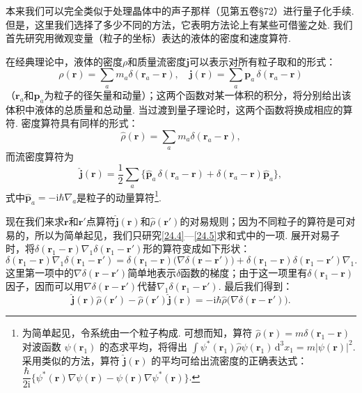 本来我们可以完全类似于处理晶体中的声子那样（见第五卷§72）进行量子化手续. 但是，这里我们选择了多少不同的方法，它表明方法论上有某些可借鉴之处. 我们首先研究用微观变量（粒子的坐标）表达的液体的密度和速度算符.

在经典理论中，液体的密度$\rho$和质量流密度$\bm{j}$可以表示对所有粒子取和的形式：
\begin{equation*}
\rho(\bm{r})=\sum_{a}m_{a}\delta(\bm{r}_{a}-\bm{r}),\quad
\bm{j}(\bm{r})=\sum_{a}\bm{p}_{a}\,\delta(\bm{r}_{a}-\bm{r})
\end{equation*}
（$\bm{r}_{a}$和$\bm{p}_{a}$为粒子的径矢量和动量）；这两个函数对某一体积的积分，将分别给出该体积中液体的总质量和总动量. 当过渡到量子理论时，这两个函数将换成相应的算符. 密度算符具有同样的形式：
\begin{equation}
\hat{\rho}(\bm{r})=\sum_{a}m_{a}\delta(\bm{r}_{a}-\bm{r}),
\label{24.4}
\end{equation}
而流密度算符为
\begin{equation}
\hat{\bm{j}}(\bm{r})=\frac{1}{2}\sum_{a}\bigl\{\hat{\bm{p}}_{a}\,\delta(\bm{r}_{a}-\bm{r})+\delta(\bm{r}_{a}-\bm{r})\hat{\bm{p}}_{a}\bigr\},
\label{24.5}
\end{equation}
式中$\hat{\bm{p}}_{a}=-\mathrm{i}\hbar\nabla_{a}$是粒子的动量算符\footnote{为简单起见，令系统由一个粒子构成. 可想而知，算符 $\hat{\rho}(\bm{r})=m\delta(\bm{r}_{1}-\bm{r})$ 对波函数 $\psi(\bm{r}_{1})$ 的态求平均，将得出 $\int\psi^{*}(\bm{r}_{1})\hat{\rho}\psi(\bm{r}_{1})\,\mathrm{d}^{3}x_{1}=m\vert\psi(\bm{r})\vert^{2}$. 采用类似的方法，算符 $\hat{\bm{j}}(\bm{r})$ 的平均可给出流密度的正确表达式：$\dfrac{\hbar}{2\mathrm{i}}\{\psi^{*}(\bm{r})\nabla\psi(\bm{r})-\psi(\bm{r})\nabla\psi^{*}(\bm{r})\}$.}.

现在我们来求$\bm{r}$和$\bm{r}'$点算符$\hat{\bm{j}}(\bm{r})$和$\hat{\rho}(\bm{r}')$的对易规则；因为不同粒子的算符是可对易的，所以为简单起见，我们只研究\eqref{24.4}—\eqref{24.5}求和式中的一项. 展开对易子时，将$\delta(\bm{r}_{1}-\bm{r})\nabla_{1}\delta(\bm{r}_{1}-\bm{r}')$形的算符变成如下形状：
\begin{equation*}
\delta(\bm{r}_{1}-\bm{r})\nabla_{1}\delta(\bm{r}_{1}-\bm{r}')
=\delta(\bm{r}_{1}-\bm{r})\bigl(\nabla\delta(\bm{r}-\bm{r}')\bigr)
+\delta(\bm{r}_{1}-\bm{r})\delta(\bm{r}_{1}-\bm{r}')\nabla_{1}.
\end{equation*}
这里第一项中的$\nabla\delta(\bm{r}-\bm{r}')$简单地表示$\delta$函数的梯度；由于这一项里有$\delta(\bm{r}_{1}-\bm{r})$因子，因而可以用$\nabla\delta(\bm{r}-\bm{r}')$代替$\nabla_{1}\delta(\bm{r}_{1}-\bm{r}')$. 最后我们得到：
\begin{equation}
\hat{\bm{j}}(\bm{r})\hat{\rho}(\bm{r}')-\hat{\rho}(\bm{r}')\hat{\bm{j}}(\bm{r})
=-\mathrm{i}\hbar\hat{\rho}\bigl(\nabla\delta(\bm{r}-\bm{r}')\bigr).
\label{24.6}
\end{equation}

